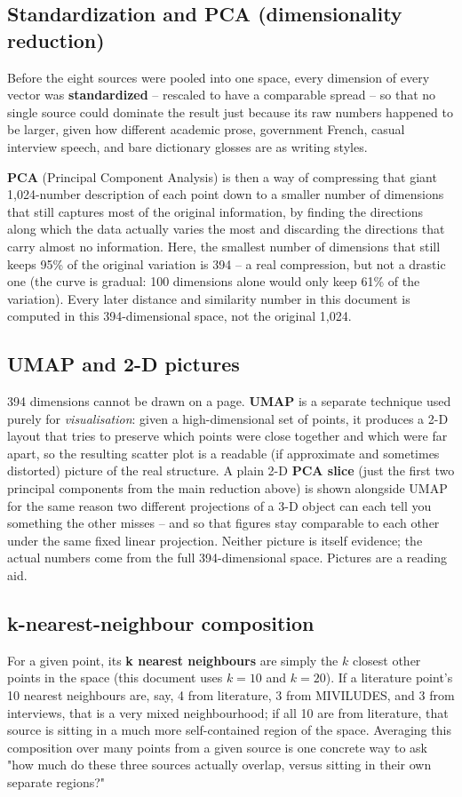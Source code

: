\documentclass[11pt,a4paper]{article}
\newcommand{\jargon}[1]{\textbf{#1}}
\begin{document}
\subsection{Standardization and PCA (dimensionality reduction)}
Before the eight sources were pooled into one space, every dimension of
every vector was \jargon{standardized} -- rescaled to have a comparable
spread -- so that no single source could dominate the result just
because its raw numbers happened to be larger, given how different
academic prose, government French, casual interview speech, and bare
dictionary glosses are as writing styles.

\jargon{PCA} (Principal Component Analysis) is then a way of compressing
that giant 1,024-number description of each point down to a smaller
number of dimensions that still captures most of the original
information, by finding the directions along which the data actually
varies the most and discarding the directions that carry almost no
information. Here, the smallest number of dimensions that still keeps
95\% of the original variation is 394 -- a real compression, but not a
drastic one (the curve is gradual: 100 dimensions alone would only keep
61\% of the variation). Every later distance and similarity number in
this document is computed in this 394-dimensional space, not the
original 1,024.

\subsection{UMAP and 2-D pictures}
394 dimensions cannot be drawn on a page. \jargon{UMAP} is a separate
technique used purely for \emph{visualisation}: given a high-dimensional
set of points, it produces a 2-D layout that tries to preserve which
points were close together and which were far apart, so the resulting
scatter plot is a readable (if approximate and sometimes distorted)
picture of the real structure. A plain 2-D \jargon{PCA slice} (just the
first two principal components from the main reduction above) is shown
alongside UMAP for the same reason two different projections of a 3-D
object can each tell you something the other misses -- and so that
figures stay comparable to each other under the same fixed linear
projection. Neither picture is itself evidence; the actual numbers come
from the full 394-dimensional space. Pictures are a reading aid.

\subsection{k-nearest-neighbour composition}
For a given point, its \jargon{k nearest neighbours} are simply the $k$
closest other points in the space (this document uses $k=10$ and
$k=20$). If a literature point's 10 nearest neighbours are, say, 4 from
literature, 3 from MIVILUDES, and 3 from interviews, that is a very
mixed neighbourhood; if all 10 are from literature, that source is
sitting in a much more self-contained region of the space. Averaging
this composition over many points from a given source is one concrete
way to ask "how much do these three sources actually overlap, versus
sitting in their own separate regions?"
\end{document}
